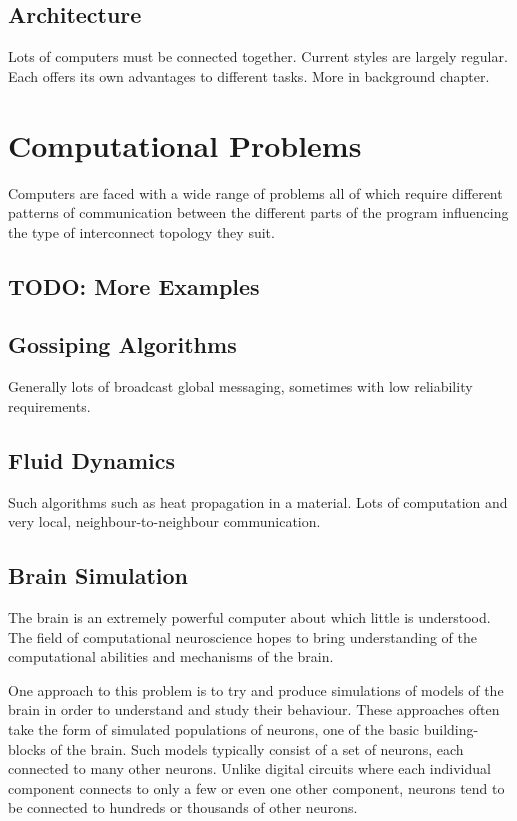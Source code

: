 		\subsection{Architecture}
			
			Lots of computers must be connected together. Current styles are largely
			regular. Each offers its own advantages to different tasks. More in
			background chapter.
	
	\section{Computational Problems}
		
		Computers are faced with a wide range of problems all of which require
		different patterns of communication between the different parts of the
		program influencing the type of interconnect topology they suit.
		
		\subsection{TODO: More Examples}
		
		\subsection{Gossiping Algorithms}
			
			Generally lots of broadcast global messaging, sometimes with low
			reliability requirements.
		
		\subsection{Fluid Dynamics}
			
			Such algorithms such as heat propagation in a material. Lots of
			computation and very local, neighbour-to-neighbour communication.
		
		\subsection{Brain Simulation}
			
			
			The brain is an extremely powerful computer about which little is
			understood. The field of computational neuroscience hopes to bring
			understanding of the computational abilities and mechanisms of the
			brain.
			
			One approach to this problem is to try and produce simulations of models
			of the brain in order to understand and study their behaviour. These
			approaches often take the form of simulated populations of neurons, one
			of the basic building-blocks of the brain. Such models typically consist
			of a set of neurons, each connected to many other neurons.  Unlike
			digital circuits where each individual component connects to only a few
			or even one other component, neurons tend to be connected to hundreds or
			thousands of other neurons.
			
